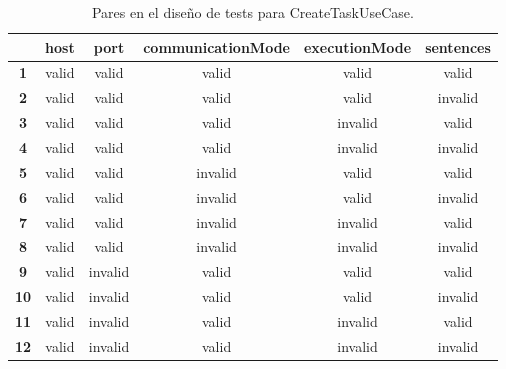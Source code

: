 \begin{table}[H]
    \caption{Pares en el diseño de tests para CreateTaskUseCase.}\label{tab:pairsCreateTaskUseCase}
    \small
    \begin{tabular}{cccccc}
        \textbf{}   & \textbf{host} & \textbf{port} & \textbf{communicationMode} & \textbf{executionMode} & \textbf{sentences} \\
        \hline
        \textbf{1}  & valid         & valid         & valid                      & valid                  & valid              \\
        \hline
        \textbf{2}  & valid         & valid         & valid                      & valid                  & invalid            \\
        \hline
        \textbf{3}  & valid         & valid         & valid                      & invalid                & valid              \\
        \hline
        \textbf{4}  & valid         & valid         & valid                      & invalid                & invalid            \\
        \hline
        \textbf{5}  & valid         & valid         & invalid                    & valid                  & valid              \\
        \hline
        \textbf{6}  & valid         & valid         & invalid                    & valid                  & invalid            \\
        \hline
        \textbf{7}  & valid         & valid         & invalid                    & invalid                & valid              \\
        \hline
        \textbf{8}  & valid         & valid         & invalid                    & invalid                & invalid            \\
        \hline
        \textbf{9}  & valid         & invalid       & valid                      & valid                  & valid              \\
        \hline
        \textbf{10} & valid         & invalid       & valid                      & valid                  & invalid            \\
        \hline
        \textbf{11} & valid         & invalid       & valid                      & invalid                & valid              \\
        \hline
        \textbf{12} & valid         & invalid       & valid                      & invalid                & invalid            \\

\end{tabular}
\end{table}
